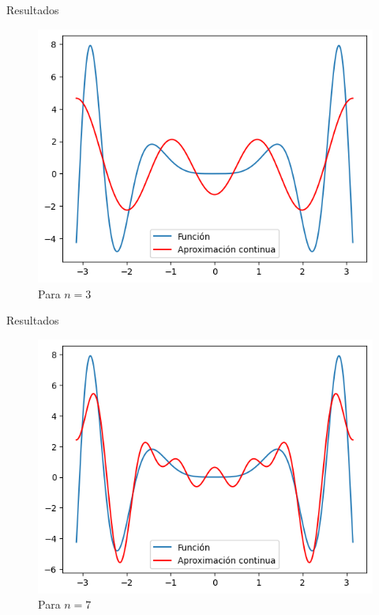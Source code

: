 \begin{frame}{Resultados}
    \begin{figure}
        \centering
        \includegraphics[width=.75\paperwidth]{p13-Aprox-continua.png}
        \caption{Para $n=3$}
    \end{figure}
\end{frame}

\begin{frame}{Resultados}
    \begin{figure}
        \centering
        \includegraphics[width=.75\paperwidth]{p13-A-continua.png}
        \caption{Para $n=7$}
    \end{figure}
\end{frame}

